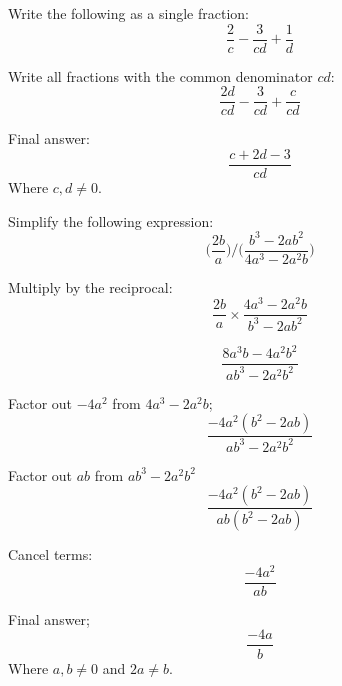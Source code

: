 \documentclass[a4paper]{tufte-handout}
\begin{document}
\begin{question}
\vspace{1.5cm}
	
\qpart
Write the following as a single fraction:
	\[\frac{2}{c}-\frac{3}{cd}+\frac{1}{d}\]
	
Write all fractions with the common denominator $cd$:
	\[\frac{2d}{cd}-\frac{3}{cd}+\frac{c}{cd}\]
	
Final answer:
	\[\frac{c+2d-3}{cd}\]
\hfill Where $c, d \neq 0$.

\pagebreak

\qpart
Simplify the following expression:
\[\biggl(\frac{2b}{a}\biggl)\biggl/\biggl(\frac{b^3-2ab^2}{4a^3-2a^2b}\biggl)\]

Multiply by the reciprocal:
	\[\frac{2b}{a}\times\frac{4a^3-2a^2b}{b^3-2ab^2}\]
	
\bigskip	

	\[\frac{8a^3b-4a^2b^2}{ab^3-2a^2b^2}\]
	
Factor out $-4a^2$ from $4a^3-2a^2b$;
	\[\frac{-4a^2(b^2-2ab)}{ab^3-2a^2b^2}\]
	
\bigskip	
	
Factor out $ab$ from $ab^3-2a^2b^2$
	\[\frac{-4a^2(b^2-2ab)}{ab(b^2-2ab)}\]
	
\bigskip
	
Cancel terms:
	\[\frac{-4a^2}{ab}\]
	
\bigskip	
	
Final answer;
	\[\frac{-4a}{b}\]
\hfill Where $a, b \neq 0$ and $2a \neq b$.

\end{question}
\end{document}
